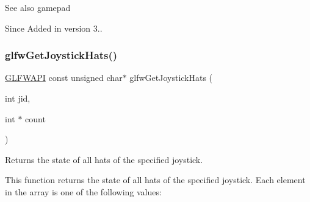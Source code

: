 \begin{DoxySeeAlso}{See also}
gamepad
\end{DoxySeeAlso}
\begin{DoxySince}{Since}
Added in version 3.. 
\end{DoxySince}
\mbox{\label{group__input_gab2db5ba5f1a85c306a1355bdca52e6be}} 
\subsubsection{\texorpdfstring{glfwGetJoystickHats()}{glfwGetJoystickHats()}}
{\footnotesize\ttfamily \mbox{\hyperlink{glfw3_8h_a56da5036b2cc259351ae22fd6439bb47}{G\+L\+F\+W\+A\+PI}} const unsigned char$\ast$ glfw\+Get\+Joystick\+Hats (\begin{DoxyParamCaption}\item[{int}]{jid,  }\item[{int $\ast$}]{count }\end{DoxyParamCaption})}



Returns the state of all hats of the specified joystick. 

This function returns the state of all hats of the specified joystick. Each element in the array is one of the following values\+:

